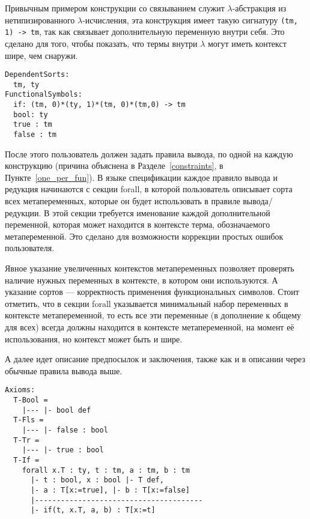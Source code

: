 Привычным примером конструкции со связыванием служит $\lambda$-абстракция из нетипизированного $\lambda$-исчисления, эта конструкция имеет такую сигнатуру \lstinline{(tm, 1) -> tm}, так как связывает дополнительную переменную внутри себя. Это сделано для того, чтобы показать, что термы внутри $\lambda$ могут иметь контекст шире, чем снаружи.

\begin{lstlisting}[label={lst_bool_funs}, caption={Конструкции и сорты языка Bool, описанные в языке спецификации},captionpos=b, frame=single, float]
DependentSorts:
  tm, ty
FunctionalSymbols:
  if: (tm, 0)*(ty, 1)*(tm, 0)*(tm,0) -> tm
  bool: ty
  true : tm
  false : tm
\end{lstlisting}

После этого пользователь должен задать правила вывода, по одной на каждую конструкцию (причина объяснена в Разделе~\ref{constraints}, в Пункте~\ref{one_per_fun}). В языке спецификации каждое правило вывода и редукция начинаются с секции forall, в которой пользователь описывает сорта всех метапеременных, которые он будет использовать в правиле вывода/редукции. В этой секции требуется именование каждой дополнительной переменной, которая может находится в контексте терма, обозначаемого метапеременной. Это сделано для возможности коррекции простых ошибок пользователя.

Явное указание увеличенных контекстов метапеременных позволяет проверять наличие нужных переменных в контексте, в котором они используются. А указание сортов --- корректность применения функциональных символов. Стоит отметить, что в секции forall указывается минимальный набор переменных в контексте метапеременной, то есть все эти переменные (в дополнение к общему для всех) всегда должны находится в контексте метапеременной, на момент её использования, но контекст может быть и шире.

А далее идет описание предпосылок и заключения, также как и в описании через обычные правила вывода выше.

\begin{lstlisting}[label={lst_bool_axs}, caption={Правила вывода языка Bool, описанные в языке спецификации},captionpos=b, frame=single, float]
Axioms:
  T-Bool =
    |--- |- bool def
  T-Fls =
    |--- |- false : bool
  T-Tr =
    |--- |- true : bool
  T-If =
    forall x.T : ty, t : tm, a : tm, b : tm
      |- t : bool, x : bool |- T def,
      |- a : T[x:=true], |- b : T[x:=false]
      |---------------------------------------
      |- if(t, x.T, a, b) : T[x:=t]
\end{lstlisting}

